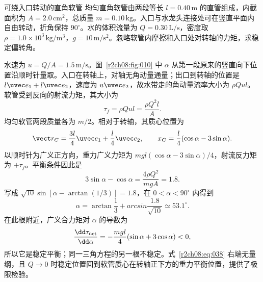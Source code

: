 \begin{practicebox}{可绕入口转动的直角软管}
均匀直角软管由两段等长 $l=0.40\,\mathrm m$ 的直管组成，内截面积为 $A=2.0\,\mathrm{cm^2}$，总质量 $m=0.10\,\mathrm{kg}$。入口与水龙头连接处可在竖直平面内自由转动，折角保持 $90^\circ$。水的体积流量为 $Q=0.30\,\mathrm{L/s}$，密度取 $\rho=1.0\times10^3\,\mathrm{kg/m^3}$，$g=10\,\mathrm{m/s^2}$。忽略软管内摩擦和入口处对转轴的力矩，求稳定偏转角。
\label{r2ch08:pr:006}
\begin{solution}
水速为 $u=Q/A=1.5\,\mathrm{m/s}$。图~\ref{r2ch08:fig:010} 中 $\alpha$ 从第一段原来的竖直向下位置沿顺时针量取。入口在转轴上，对轴无角动量通量；出口到转轴的位置是 $l\uvec e_1+l\uvec e_2$，速度为 $u\uvec e_2$，故水带走的角动量流率大小为 $\rho Qul$。软管受到反向的射流力矩，其大小为
\begin{equation}
 \tau_f=\rho Qul=\frac{\rho Q^2l}{A}.
 \label{r2ch08:eq:036}
\end{equation}
均匀软管两段质量各为 $m/2$。相对于转轴，其质心位置为
\begin{equation}
 \vect r_C=\frac{3l}{4}\uvec e_1+\frac l4\uvec e_2,
 \qquad x_C=\frac l4(\cos\alpha-3\sin\alpha).
 \label{r2ch08:eq:037}
\end{equation}
以顺时针为广义正方向，重力广义力矩为 $mgl(\cos\alpha-3\sin\alpha)/4$，射流反力矩为 $+\tau_f$。平衡条件因此是
\begin{equation}
 3\sin\alpha-\cos\alpha
 =\frac{4\rho Q^2}{mgA}=1.8.
 \label{r2ch08:eq:038}
\end{equation}
写成 $\sqrt{10}\sin[\alpha-\arctan(1/3)]=1.8$，在 $0<\alpha<90^\circ$ 内得到
\begin{equation}
 \boxed{\alpha=\arctan\frac13+arcsin\frac{1.8}{\sqrt{10}}
 \simeq53.1^\circ}.
 \label{r2ch08:eq:039}
\end{equation}
在此根附近，广义合力矩对 $\alpha$ 的导数为
\begin{equation}
 \frac{\dd\tau_{\rm net}}{\dd\alpha}
 =-\frac{mgl}{4}(\sin\alpha+3\cos\alpha)<0,
 \label{r2ch08:eq:040}
\end{equation}
所以它是稳定平衡；同一三角方程的另一根不稳定。式~\eqref{r2ch08:eq:038} 右端无量纲，且 $Q\to0$ 时稳定位置回到软管质心在转轴正下方的重力平衡位置，提供了极限检验。
\figHose
\end{solution}
\end{practicebox}
